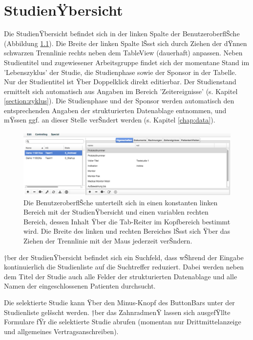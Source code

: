 \documentclass[11pt,oneside]{scrbook}
\begin{document}
\chapter{StudienŸbersicht}
Die StudienŸbersicht befindet sich in der linken Spalte der BenutzeroberflŠche (Abbildung \ref{fig:uebersicht}). Die Breite der linken Spalte lŠsst sich durch Ziehen der dŸnnen schwarzen Trennlinie rechts neben dem TableView (dauerhaft) anpassen. Neben Studientitel und zugewiesener Arbeitsgruppe findet sich der momentane Stand im 'Lebenszyklus' der Studie, die Studienphase sowie der Sponsor in der Tabelle. Nur der Studientitel ist Ÿber Doppelklick direkt editierbar. Der Studienstand ermittelt sich automatisch aus Angaben im Bereich 'Zeitereignisse' (s. Kapitel \ref{section:zyklus}). Die  Studienphase und der Sponsor werden  automatisch den entsprechenden Angaben der strukturierten Datenablage entnommen, und mŸssen ggf. an dieser Stelle verŠndert werden (s. Kapitel \ref{chap:data}).

\begin{figure}[htbp]
\begin{center}
\includegraphics[scale=0.38]{figs/overview.png}
\caption{Die BenutzeroberflŠche unterteilt sich in einen konstanten linken Bereich mit der StudienŸbersicht und einen variablen rechten Bereich, dessen Inhalt Ÿber die Tab-Reiter im Kopfbereich bestimmt wird. Die Breite des linken und rechten Bereiches lŠsst sich Ÿber das Ziehen der Trennlinie mit der Maus jederzeit verŠndern.}
\label{fig:uebersicht}
\end{center}
\end{figure}

†ber der StudienŸbersicht befindet sich ein Suchfeld, dass wŠhrend  der Eingabe kontinuierlich die Studienliste auf die Suchtreffer reduziert. Dabei werden  neben dem Titel der Studie auch alle Felder der strukturierten Datenablage und alle Namen der eingeschlossenen Patienten durchsucht.

Die selektierte Studie kann Ÿber den Minus-Knopf des ButtonBars unter der Studienliste gelšscht werden. †ber das ZahnradmenŸ lassen sich ausgefŸllte Formulare fŸr die selektierte Studie abrufen  (momentan nur Drittmittelanzeige und allgemeines Vertragsanschreiben).
\end{document}
